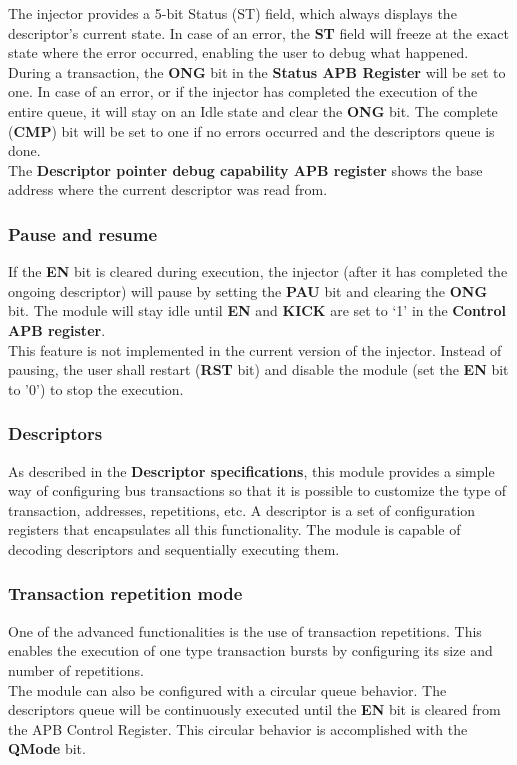 The injector provides a 5-bit Status (ST) field, which always displays the descriptor's current state. In case of an error, the \textbf{ST} field will freeze at the exact state where the error occurred, enabling the user to debug what happened.\\
During a transaction, the \textbf{ONG} bit in the \textbf{Status APB Register} will be set to one. In case of an error, or if the injector has completed the execution of the entire queue, it will stay on an Idle state and clear the \textbf{ONG} bit. 
The complete (\textbf{CMP}) bit will be set to one if no errors occurred and the descriptors queue is done. \\
The \textbf{Descriptor pointer debug capability APB register} shows the base address where the current descriptor was read from.

\subsubsection{Pause and resume}
If the \textbf{EN} bit is cleared during execution, the injector (after it has completed the ongoing descriptor) will pause by setting the \textbf{PAU} bit and clearing the \textbf{ONG} bit. The module will stay idle until \textbf{EN} and \textbf{KICK} are set to ‘1’ in the \textbf{Control APB register}. \\
This feature is not implemented in the current version of the injector. Instead of pausing, the user shall restart (\textbf{RST} bit) and disable the module (set the \textbf{EN} bit to '0') to stop the execution.

\subsubsection{Descriptors}
As described in the \textbf{Descriptor specifications}, this module provides a simple way of configuring bus transactions so that it is possible to customize the type of transaction, addresses, repetitions, etc. A descriptor is a set of configuration registers that encapsulates all this functionality. The module is capable of decoding descriptors and sequentially executing them.

\subsubsection{Transaction repetition mode}
One of the advanced functionalities is the use of transaction repetitions. This enables the execution of one type transaction bursts by configuring its size and number of repetitions.\\
The module can also be configured with a circular queue behavior. The descriptors queue will be continuously executed until the \textbf{EN} bit is cleared from the APB Control Register. This circular behavior is accomplished with the \textbf{QMode} bit.

